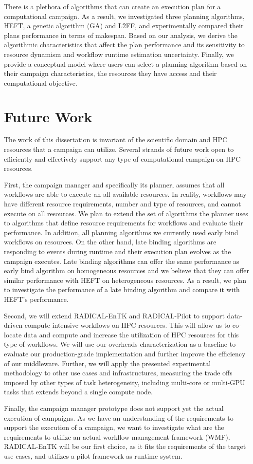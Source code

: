 There is a plethora of algorithms that can create an execution plan for a computational campaign.
As a result, we investigated three planning algorithms, HEFT, a genetic algorithm (GA) and L2FF, and experimentally compared their plans performance in terms of makespan.
Based on our analysis, we derive the algorithmic characteristics that affect the plan performance and its sensitivity to resource dynamism and workflow runtime estimation uncertainty.
Finally, we provide a conceptual model where users can select a planning algorithm based on their campaign characteristics, the resources they have access and their computational objective.


\section{Future Work}
The work of this dissertation is invariant of the scientific domain and HPC resources that a campaign can utilize.
Several strands of future work open to efficiently and effectively support any type of computational campaign on HPC resources.

First, the campaign manager and specifically its planner, assumes that all workflows are able to execute an all available resources.
In reality, workflows may have different resource requirements, number and type of resources, and cannot execute on all resources.
We plan to extend the set of algorithms the planner uses to algorithms that define resource requirements for workflows and evaluate their performance.
In addition, all planning algorithms we currently used early bind workflows on resources.
On the other hand, late binding algorithms are responding to events during runtime and their execution plan evolves as the campaign executes.
Late binding algorithms can offer the same performance as early bind algorithm on homogeneous resources and we believe that they can offer similar performance with HEFT on heterogeneous resources.
As a result, we plan to investigate the performance of a late binding algorithm and compare it with HEFT's performance.

Second, we will extend RADICAL-EnTK and RADICAL-Pilot to support data-driven compute intensive workflows on HPC resources.
This will allow us to co-locate data and compute and increase the utilization of HPC resources for this type of workflows.
We will use our overheads characterization as a baseline to evaluate our production-grade implementation and further improve the efficiency of our middleware. 
Further, we will apply the presented experimental methodology to other use cases and infrastructures, measuring the trade offs imposed by other types of task heterogeneity, including multi-core or multi-GPU tasks that extends beyond a single compute node.

Finally, the campaign manager prototype does not support yet the actual execution of campaigns.
As we have an understanding of the requirements to support the execution of a campaign, we want to investigate what are the requirements to utilize an actual workflow management framework (WMF).
RADICAL-EnTK will be our first choice, as it fits the requirements of the target use cases, and utilizes a pilot framework as runtime system.

